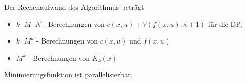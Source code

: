 Der Rechenaufwand des Algorithmus beträgt
\begin{itemize}
  \item $k\cdot M\cdot N$ - Berechnungen von $c(x,u)+V\left(f(x,u),\kappa+1 \right)$ für die \ac{DP},
  \item $k\cdot M^k$ - Berechnungen von $c(x,u)$ und $f(x,u)$
  \item $M^k$ - Berechnungen von $K_k(x)$ \hphantom{ $c(x,u)$ und $f(x,u)$}
\end{itemize}
Minimierungsfunktion ist parallelisierbar.

